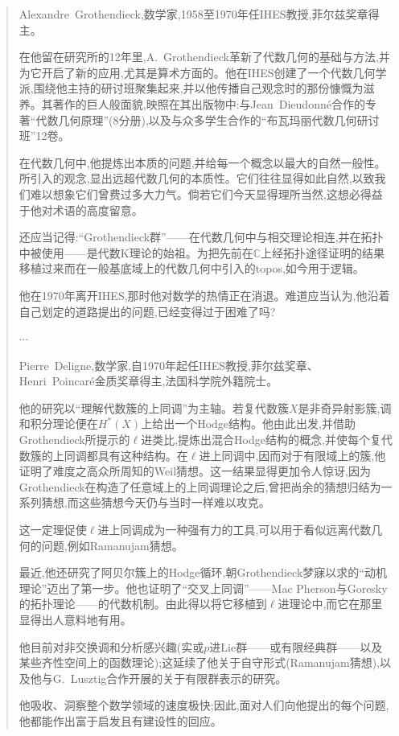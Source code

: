 \begin{quote}
Alexandre~Grothendieck,数学家,1958至1970年任IHES教授,菲尔兹奖章得主。

在他留在研究所的12年里,A.~Grothendieck革新了代数几何的基础与方法,并为它开启了新的应用,尤其是算术方面的。他在IHES创建了一个代数几何学派,围绕他主持的研讨班聚集起来,并以他传播自己观念时的那份慷慨为滋养。\dmark{}其著作的巨人般面貌,映照在其出版物中:与Jean~Dieudonné合作的专著“代数几何原理”(8分册),以及与众多学生合作的“布瓦玛丽代数几何研讨班”12卷。

在代数几何中,他提炼出本质的问题,并给每一个概念以最大的自然一般性。所引入的观念,显出远超代数几何的本质性。它们往往显得如此自然,以致我们难以想象它们曾费过多大力气。倘若它们今天显得理所当然,这想必得益于他对术语的高度留意。

还应当记得:“Grothendieck群”——在代数几何中与相交理论相连,并在拓扑中被使用——是代数K理论的始祖。为把先前在$\mathbb{C}$上经拓扑途径证明的结果移植过来而在一般基底域上的代数几何中引入的topos,如今用于逻辑。

他在1970年离开IHES,那时他对数学的热情正在消退。难道应当认为,他沿着自己划定的道路提出的问题,已经变得过于困难了吗?

\begin{center}$\cdots$\end{center}

Pierre~Deligne,数学家,自1970年起任IHES教授,菲尔兹奖章、Henri~Poincaré金质奖章得主,法国科学院外籍院士。

他的研究以“理解代数簇的上同调”为主轴。若复代数簇$X$是非奇异射影簇,调和积分理论便在$H^*(X)$上给出一个Hodge结构。他由此出发,并借助Grothendieck所提示的$\ell$进类比,提炼出混合Hodge结构的概念,并使每个复代数簇的上同调都具有这种结构。在$\ell$进上同调中,因而对于有限域上的簇,他证明了难度之高众所周知的Weil猜想。这一结果显得更加令人惊讶,因为Grothendieck在构造了任意域上的上同调理论之后,曾把尚余的猜想归结为一系列猜想,而这些猜想今天仍与当时一样难以攻克。

这一定理促使$\ell$进上同调成为一种强有力的工具,可以用于看似远离代数几何的问题,例如Ramanujam猜想。

最近,他还研究了阿贝尔簇上的Hodge循环,朝Grothendieck梦寐以求的“动机理论”迈出了第一步。他也证明了“交叉上同调”——Mac Pherson与Goresky的拓扑理论——的代数机制。由此得以将它移植到$\ell$进理论中,而它在那里显得出人意料地有用。

他目前对非交换调和分析感兴趣(实或$p$进Lie群——或有限经典群——以及某些齐性空间上的函数理论);这延续了他关于自守形式(Ramanujam猜想),以及他与G.~Lusztig合作开展的关于有限群表示的研究。

他吸收、洞察整个数学领域的速度极快;因此,面对人们向他提出的每个问题,他都能作出富于启发且有建设性的回应。
\end{quote}

